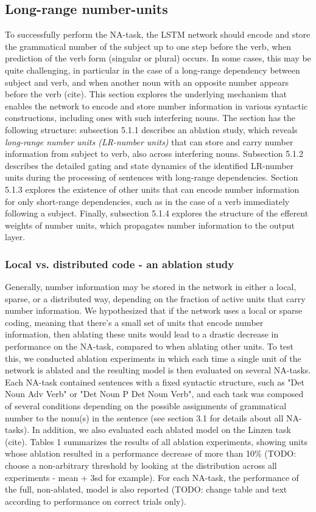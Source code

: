 \subsection{Long-range number-units}
To successfully perform the NA-task, the LSTM network should encode and store the grammatical number of the subject up to one step before the verb, when prediction of the verb form (singular or plural) occurs. In some cases, this may be quite challenging, in particular in the case of a long-range dependency between subject and verb, and when another noun with an opposite number appears before the verb (cite). This section explores the underlying mechanism that enables the network to encode and store number information in various syntactic constructions, including ones with such interfering nouns. The section has the following structure: subsection 5.1.1 describes an ablation study, which reveals \textit{long-range number units (LR-number units)} that can store and carry number information from subject to verb, also across interfering nouns. Subsection 5.1.2 describes the detailed gating and state dynamics of the identified LR-number units during the processing of sentences with long-range dependencies. Section 5.1.3 explores the existence of other units that can encode number information for only short-range dependencies, such as in the case of a verb immediately following a subject. Finally, subsection 5.1.4 explores the structure of the efferent weights of number units, which propagates number information to the output layer.

\subsubsection{Local vs. distributed code - an ablation study}
Generally, number information may be stored in the network in either a local, sparse, or a distributed way, depending on the fraction of active units that carry number information. We hypothesized that if the network uses a local or sparse coding, meaning that there's a small set of units that encode number information, then ablating these units would lead to a drastic decrease in performance on the NA-task, compared to when ablating other units. To test this, we conducted ablation experiments in which each time a single unit of the network is ablated and the resulting model is then evaluated on several NA-tasks. Each NA-task contained sentences with a fixed syntactic structure, such as "Det Noun Adv Verb" or "Det Noun P Det Noun Verb", and each task was composed of several conditions depending on the possible assignments of grammatical number to the nonu(s) in the sentence (see section 3.1 for details about all NA-tasks). In addition, we also evaluated each ablated model on the Linzen task (cite). Tables 1 summarizes the results of all ablation experiments, showing units whose ablation resulted in a performance decrease of more than 10\% (TODO: choose a non-arbitrary threshold by looking at the distribution across all experiments - mean + 3sd for example). For each NA-task, the performance of the full, non-ablated, model is also reported (TODO: change table and text according to performance on correct trials only).


